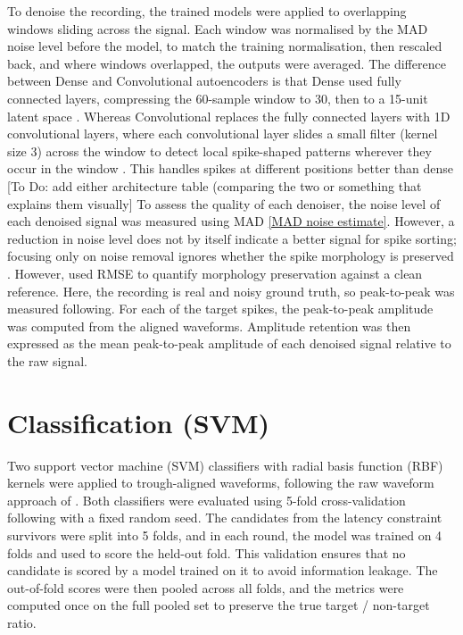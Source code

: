 \documentclass[ %
                    author={Daniel Page},
                supervisor={Dr. Andrew Calway},
                    degree={MSc},
                     title={Some Structural Guidelines for Data Science MSc Theses, Including Those With Long Titles that Run Across Multiple Lines on the Front Page},
                  subtitle={And those including an optional subtitle too, for good measure},
                      type={},
                      year={2021}]{dissertation}
\begin{document}
To denoise the recording, the trained models were applied to overlapping windows sliding across the signal. Each window was normalised by the MAD noise level before the model, to match the training normalisation, then rescaled back, and where windows overlapped, the outputs were averaged.
The difference between Dense and Convolutional autoencoders is that Dense used fully connected layers, compressing the 60-sample window to 30, then to a 15-unit latent space \cite{li_aecuration_2025}. Whereas Convolutional replaces the fully connected layers with 1D convolutional layers, where each convolutional layer slides a small filter (kernel size 3) across the window to detect local spike-shaped patterns wherever they occur in the window \cite{li_accurate_2020, kechris_removing_2021}. This handles spikes at different positions better than dense 
[To Do: add either architecture table (comparing the two or something that explains them visually]
To assess the quality of each denoiser, the noise level of each denoised signal was measured using MAD \ref{MAD noise estimate}. However, a reduction in noise level does not by itself indicate a better signal for spike sorting; focusing only on noise removal ignores whether the spike morphology is preserved \cite{baldazzi_systematic_2020}. However, \cite{baldazzi_systematic_2020} used RMSE to quantify morphology preservation against a clean reference. Here, the recording is real and noisy ground truth, so peak-to-peak was measured following\cite{adam_comparative_2025}. For each of the target spikes, the peak-to-peak amplitude was computed from the aligned waveforms. Amplitude retention was then expressed as the mean peak-to-peak amplitude of each denoised signal relative to the raw signal. 

\section{Classification (SVM)}
Two support vector machine (SVM) classifiers with radial basis function (RBF) kernels were applied to trough-aligned waveforms, following the raw waveform approach of \cite{troglio_hybrid_2026}. Both classifiers were evaluated using 5-fold cross-validation following \cite{troglio_hybrid_2026} with a fixed random seed. The candidates from the latency constraint survivors were split into 5 folds, and in each round, the model was trained on 4 folds and used to score the held-out fold. This validation ensures that no candidate is scored by a model trained on it to avoid information leakage. The out-of-fold scores were then pooled across all folds, and the metrics were computed once on the full pooled set to preserve the true target / non-target ratio. 
\end{document}
